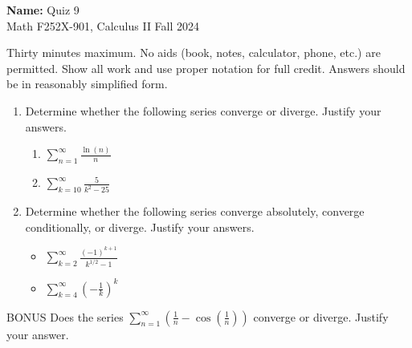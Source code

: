 \documentclass[12pt]{article}
\newcommand{\ds}{\displaystyle}
\begin{document}
\pagestyle{plain}

\noindent \textbf{Name:} \underline{\hspace{15em}}		\hfill	Quiz 9 \\
           Math F252X-901, Calculus II  			\hfill	Fall 2024 	

                \vspace{1cm}
                
Thirty minutes maximum. No aids (book, notes,
calculator, phone, etc.) are permitted. Show all work and use proper
notation for full credit. Answers should be in reasonably simplified
form.

\begin{enumerate}

\item Determine whether the following series converge or
  diverge. Justify your answers.
  \begin{enumerate}
  \item $\ds \sum_{n=1}^{\infty} \frac{\ln(n)}{n}$
    \vfill
    
  \item $\ds \sum_{k=10}^{\infty} \frac{5}{k^2-25}$
    \vfill
    
  \end{enumerate}

  \newpage

\item Determine whether the following series converge absolutely,
  converge conditionally, or diverge. Justify your answers.
  \begin{itemize}
  \item $\ds \sum_{k=2}^{\infty} \frac{(-1)^{k+1}}{k^{1/2}-1}$
    \vfill

  \item $\ds \sum_{k=4}^{\infty} \left( -\frac{1}{k} \right)^k$
    \vfill
  \end{itemize}
  
\end{enumerate}

BONUS Does the series $\ds \sum_{n=1}^{\infty} \left( \frac{1}{n} -
\cos\left(\frac{1}{n}\right) \right)$ converge or diverge. Justify
your answer.
\vfill
\end{document}
